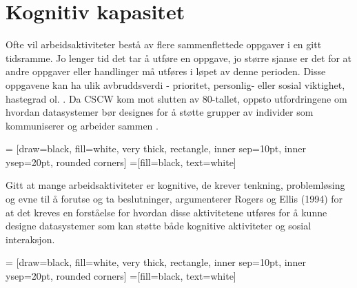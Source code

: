 \section{Kognitiv kapasitet}
\label{chp: kognisjon}

Ofte vil arbeidsaktiviteter bestå av flere sammenflettede oppgaver i en gitt tidsramme. Jo lenger tid det tar å utføre en oppgave, jo større sjanse er det for at andre oppgaver eller handlinger må utføres i løpet av denne perioden. Disse oppgavene kan ha ulik avbruddsverdi - prioritet, personlig- eller sosial viktighet, hastegrad ol. \cite{Rogers94}. 
Da CSCW kom mot slutten av 80-tallet, oppsto utfordringene om hvordan datasystemer bør designes for å støtte grupper av individer som kommuniserer og arbeider sammen \cite{Rogers94}. 

 = [draw=black, fill=white, very thick,
    rectangle, inner sep=10pt, inner ysep=20pt, rounded corners]
 =[fill=black, text=white]
%


\noindent
Gitt at mange arbeidsaktiviteter er kognitive, de krever tenkning, problemløsing og evne til å forutse og ta beslutninger, argumenterer Rogers og Ellis (1994) for at det kreves en forståelse for hvordan disse aktivitetene utføres for å kunne designe datasystemer som kan støtte både kognitive aktiviteter og sosial interaksjon.

 = [draw=black, fill=white, very thick,
    rectangle, inner sep=10pt, inner ysep=20pt, rounded corners]
 =[fill=black, text=white]
%

